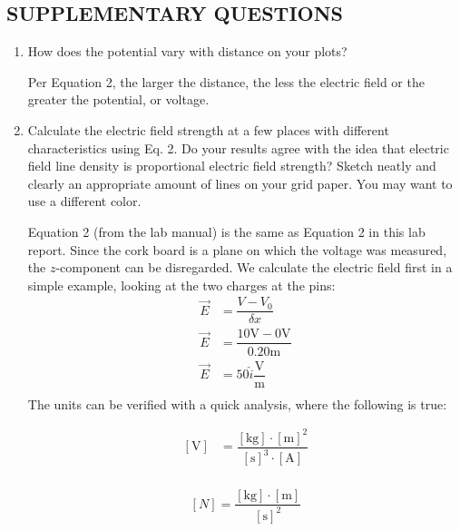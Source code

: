 \documentclass [12pt, letterpaper, twoside] {article}
\begin{document}
\subsection* {SUPPLEMENTARY QUESTIONS}
\begin{enumerate}
  \item How does the potential vary with distance on your plots?

Per Equation 2, the larger the distance, the less the electric field or the greater the potential, or voltage.
  \item Calculate the electric field strength at a few places with different characteristics using Eq. 2. Do your results agree with the idea that electric field line density is proportional electric field strength? Sketch neatly and clearly an appropriate amount of lines on your grid paper. You may want to use a different color.

Equation 2 (from the lab manual) \cite{labManual} is the same as Equation 2 in this lab report. Since the cork board is a plane on which the voltage was measured, the \(z\)-component can be disregarded. We calculate the electric field first in a simple example, looking at the two charges at the pins:
\begin{equation*}
  \begin{split}
    \vec{E} &= \dfrac{V-V_{0}}{\delta{x}} \\
    \vec{E} &= \dfrac{10\text{V}-0\text{V}}{0.20\text{m}} \\
    \vec{E} &= 50\hat{i}\dfrac{\text{V}}{\text{m}} \\
  \end{split}
\end{equation*}
The units can be verified with a quick analysis, where the following is true:

\begin{equation}
  \begin{split} 
    [\text{V}] &= \dfrac{[\text{kg}]\cdot{[\text{m}]^2}}{[\text{s}]^3\cdot{[\text{A}]}} \\
  \end{split}
\end{equation}

\begin{equation}
  \begin{split}
    [N] = \dfrac{[\text{kg}]\cdot{[\text{m}]}}{[\text{s}]^2}\\
  \end{split}
\end{equation}


\end{enumerate}
\end{document}

